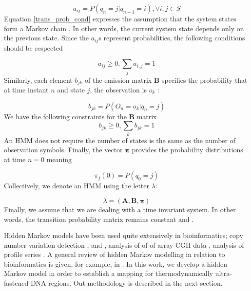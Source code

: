 \documentclass[12pt]{article}
\begin{document}
\begin{equation}
a_{ij} = P(q_n = j | q_{n-1} = i), \forall i,j \in S
\label{trans_prob_cond}
\end{equation}
Equation \ref{trans_prob_cond} expresses the assumption that the system states form a Markov chain \cite{rabiner2009}. In other words, the current system state depends only on the previous state.
Since the $a_{ij}$s represent probabilities, the following conditions should be respected \cite{koski}

\begin{equation}
a_{ij} \geq 0, \sum_{j} a_{i,j} = 1 
\end{equation}
Similarly, each element $b_{jk}$ of the emission matrix $\mathbf{B}$ specifies the probability that at time instant $n$ and state $j$, the observation is $o_k$ \cite{koski}:

\begin{equation}
b_{jk} = P(O_n = o_k | q_n = j)
\end{equation}
We have the following constraints for the $\mathbf{B}$ matrix
\begin{equation}
b_{jk} \geq 0, \sum_{k} b_{jk} = 1 
\label{emiss_prob_cond}
\end{equation}
An HMM does not require the number of states is the same as the number of observation symbols. 
Finally, the vector $\boldsymbol{\pi}$ provides the probability distributions at time $n=0$ meaning 

\begin{equation}
\pi_j(0) = P(q_0 = j)
\end{equation}
Collectively, we denote an HMM using the letter $\lambda$:

\begin{equation}
\lambda = (\mathbf{A}, \mathbf{B}, \boldsymbol{\pi})
\label{hmm}
\end{equation}
Finally, we assume that we are dealing with a time invariant system. In other words, the transition probability matrix remains constant \cite{rabiner2009} and \cite{koski}. 

Hidden Markov models have been used quite extensively in bioinformatics; copy number variation detection  \cite{coella2007},  \cite{Wang2007} and  \cite{cahan2008}, analysis of of of array CGH data \cite{fridlyand2004}, 
analysis of profile series \cite{Sschliep2003}. A general review of hidden Markov modelling in relation to bioinformatics is given, for example, in \cite{koski}. In this work, we develop a  hidden Markov model
in order to establish a mapping for thermodynamically ultra-fastened DNA regions. Out methodology  is described in the next section.
\end{document}
